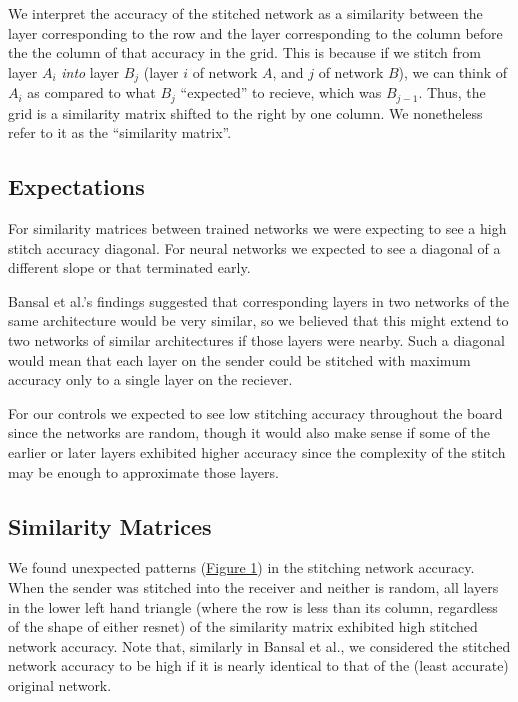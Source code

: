 \documentclass{article} %
\begin{document}
We interpret the accuracy of the stitched network as a similarity between the layer corresponding to
the row and the layer corresponding to the column before the the column of that accuracy in the grid.
This is because if we stitch from layer $A_i$ \textit{into} layer $B_j$
(layer $i$ of network $A$, and $j$ of network $B$),
we can think of $A_i$ as compared to what $B_j$ ``expected'' to recieve, which was $B_{j-1}$. Thus,
the grid is a similarity matrix shifted to the right by one column.  We nonetheless refer to it as the
``similarity matrix''.

\subsection*{Expectations}
For similarity matrices between trained networks we were expecting to see a high stitch accuracy diagonal.
For neural networks we expected to see a diagonal of a different slope or that terminated early.

Bansal et al.'s findings suggested that corresponding layers in
two networks of the same architecture would be very similar, so we believed that this might extend to two networks of
similar architectures if those layers were nearby.
Such a diagonal would mean that each layer on the sender could be stitched with maximum accuracy 
only to a single layer on the reciever.

For our controls we expected to see low stitching accuracy throughout the board since the networks are random, though
it would also make sense if some of the earlier or later layers exhibited higher accuracy since the complexity of the stitch
may be enough to approximate those layers. %

\subsection*{Similarity Matrices}
We found unexpected patterns (\hyperref[Figure2]{Figure 1}) in the stitching network accuracy.
When the sender was stitched into
the receiver and neither is random, all layers in the lower left hand triangle (where the row is less than its column, 
regardless of the shape of either resnet)
of the similarity matrix exhibited high stitched network accuracy. Note that, similarly in Bansal et al.,
we considered the stitched network accuracy to be high if it is nearly identical to that of the
(least accurate) original network.
\end{document}
